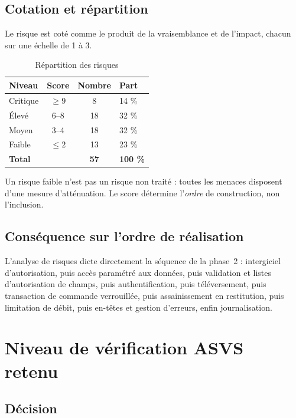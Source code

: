 \subsection{Cotation et répartition}

Le risque est coté comme le produit de la vraisemblance et de l'impact, chacun
sur une échelle de 1 à 3.

\begin{table}[H]
\centering
\caption{Répartition des risques}
\label{tab:repartition-risques}
\small
\begin{tabular}{@{}lccl@{}}
\toprule
\textbf{Niveau} & \textbf{Score} & \textbf{Nombre} & \textbf{Part} \\
\midrule
Critique & $\geq 9$ & 8  & 14 \% \\
Élevé    & 6--8     & 18 & 32 \% \\
Moyen    & 3--4     & 18 & 32 \% \\
Faible   & $\leq 2$ & 13 & 23 \% \\
\midrule
\textbf{Total} & & \textbf{57} & \textbf{100 \%} \\
\bottomrule
\end{tabular}
\end{table}

Un risque faible n'est pas un risque non traité : toutes les menaces disposent
d'une mesure d'atténuation. Le score détermine l'\emph{ordre} de construction,
non l'inclusion.

\subsection{Conséquence sur l'ordre de réalisation}

L'analyse de risques dicte directement la séquence de la phase~2 : intergiciel
d'autorisation, puis accès paramétré aux données, puis validation et listes
d'autorisation de champs, puis authentification, puis téléversement, puis
transaction de commande verrouillée, puis assainissement en restitution, puis
limitation de débit, puis en-têtes et gestion d'erreurs, enfin journalisation.

\section{Niveau de vérification ASVS retenu}

\subsection{Décision}

